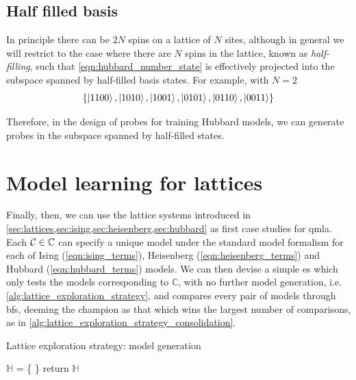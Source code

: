 \subsection{Half filled basis}
In principle there can be $2N$ spins on a lattice of $N$ sites, 
    although in general we will restrict to the case where there are $N$ spins in the lattice, 
    known as \emph{half-filling}, such that \cref{eqn:hubbard_number_state} is effectively projected into the subspace 
    spanned by half-filled basis states. 
For example, with $N=2$
\begin{equation}
    \label{eqn:hubbard_half_filled_basis_states}
    \{
        \ket{ 1100 }, \ket{ 1010 }, \ket{ 1001 }, 
        \ket{ 0101 }, \ket{ 0110 }, \ket{ 0011 }
    \}
\end{equation}

Therefore, in the design of probes for training Hubbard models, 
    we can generate probes in the subspace spanned by half-filled states. 

\section{Model learning for lattices}
Finally, then, we can use the lattice systems introduced in \cref{sec:lattices,sec:ising,sec:heisenberg,sec:hubbard}
    as first case studies for \gls{qmla}. 
Each ${ \mathcal{C}} \in \mathbb{C}$ can specify a unique model under the standard model formalism
    for each of Ising (\cref{eqn:ising_terms}), Heisenberg (\cref{eqn:heisenberg_terms}) 
    and Hubbard (\cref{eqn:hubbard_terms}) models.     
We can then devise a simple \gls{es} which only tests the models corresponding to $\mathbb{C}$, 
    with no further model generation, i.e. \cref{alg:lattice_exploration_strategy}, 
    and compares every pair of models through \glspl{bf}, 
    deeming the champion as that which wins the largest number of comparisons, 
    as in \cref{alg:lattice_exploration_strategy_consolidation}.

\begin{algorithm}
    \caption{Lattice exploration strategy: model generation}
    \label{alg:lattice_exploration_strategy}
    \DontPrintSemicolon

    \;

    $\mathbb{H}$ = \{ \}\;
    return $\mathbb{H}$
\end{algorithm}

